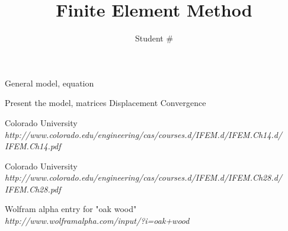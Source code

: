 \documentclass[9pt]{extarticle}
\title{Finite Element Method}
\author{Student \# }
\begin{document}
\maketitle



General model, equation




Present the model, matrices
Displacement
Convergence






















\begin{thebibliography}{2}

	Colorado University\\
	\emph{http://www.colorado.edu/engineering/cas/courses.d/IFEM.d/IFEM.Ch14.d/\\IFEM.Ch14.pdf}


	Colorado University\\
	\emph{http://www.colorado.edu/engineering/cas/courses.d/IFEM.d/IFEM.Ch28.d/\\IFEM.Ch28.pdf}	

	Wolfram alpha entry for "oak wood"\\
	\emph{http://www.wolframalpha.com/input/?i=oak+wood}

\end{thebibliography}
\end{document}
